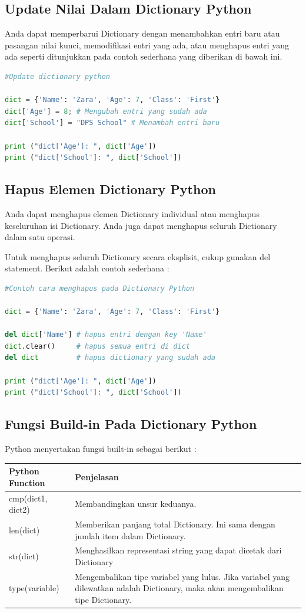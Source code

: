 \subsection{Update Nilai Dalam Dictionary Python}
Anda dapat memperbarui Dictionary dengan menambahkan entri baru atau pasangan nilai kunci, memodifikasi entri yang ada, atau menghapus entri yang ada seperti ditunjukkan pada contoh sederhana yang diberikan di bawah ini.
\begin{lstlisting}[language=Python]
#Update dictionary python

dict = {'Name': 'Zara', 'Age': 7, 'Class': 'First'}
dict['Age'] = 8; # Mengubah entri yang sudah ada
dict['School'] = "DPS School" # Menambah entri baru

print ("dict['Age']: ", dict['Age'])
print ("dict['School']: ", dict['School'])
\end{lstlisting}

\subsection{Hapus Elemen Dictionary Python}
Anda dapat menghapus elemen Dictionary individual atau menghapus keseluruhan isi Dictionary. Anda juga dapat menghapus seluruh Dictionary dalam satu operasi.

Untuk menghapus seluruh Dictionary secara eksplisit, cukup gunakan del statement. Berikut adalah contoh sederhana :
\begin{lstlisting}[language=Python]
#Contoh cara menghapus pada Dictionary Python

dict = {'Name': 'Zara', 'Age': 7, 'Class': 'First'}

del dict['Name'] # hapus entri dengan key 'Name'
dict.clear()     # hapus semua entri di dict
del dict         # hapus dictionary yang sudah ada

print ("dict['Age']: ", dict['Age'])
print ("dict['School']: ", dict['School'])
\end{lstlisting}

\subsection{Fungsi Build-in Pada Dictionary Python}
Python menyertakan fungsi built-in sebagai berikut :
\begin{center}
\begin{tabular}{ | m{4cm} | m{4cm} | }
\hline
Python Function & Penjelasan \\
\hline
cmp(dict1, dict2) & Membandingkan unsur keduanya. \\
\hline
len(dict) & Memberikan panjang total Dictionary. Ini sama dengan jumlah item dalam Dictionary. \\
\hline
str(dict) & Menghasilkan representasi string yang dapat dicetak dari Dictionary \\
\hline
type(variable) & Mengembalikan tipe variabel yang lulus. Jika variabel yang dilewatkan adalah Dictionary, maka akan mengembalikan tipe Dictionary. \\
\hline
\end{tabular}
\end{center}

